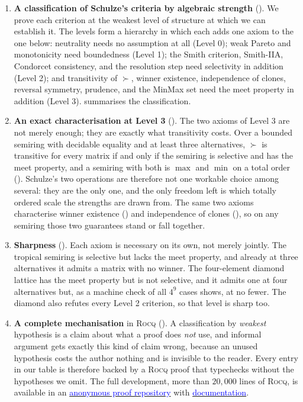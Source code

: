 \documentclass[a4paper,UKenglish,cleveref,autoref,thm-restate,anonymous]{lipics-v2021}
\newcommand{\rocq}{\textsc{Rocq}}
\begin{document}
\begin{enumerate}
\item \textbf{A classification of Schulze's criteria by algebraic strength}
(). We prove each criterion at the weakest level
of structure at which we can establish it. The levels form a hierarchy in
which each adds one axiom to the one below: neutrality needs no assumption
at all (Level 0); weak Pareto and monotonicity need boundedness (Level 1);
the Smith criterion, Smith-IIA, Condorcet consistency, and the resolution
step need selectivity in addition (Level 2); and transitivity of $\succ$,
winner existence, independence of clones, reversal symmetry, prudence, and
the MinMax set need the meet property in addition (Level 3).
 summarises the classification.

\item \textbf{An exact characterisation at Level 3}
(). The two axioms of Level 3 are not merely
enough; they are exactly what transitivity costs. Over a bounded semiring
with decidable equality and at least three alternatives, $\succ$ is
transitive for every matrix if and only if the semiring is selective and
has the meet property, and a semiring with both is $\max$ and $\min$ on a
total order (). Schulze's two operations are therefore
not one workable choice among several: they are the only one, and the only
freedom left is which totally ordered scale the strengths are drawn from.
The same two axioms characterise winner existence
() and independence of clones (),
so on any semiring those two guarantees stand or fall together.

\item \textbf{Sharpness} (). Each axiom is necessary on
its own, not merely jointly. The tropical semiring is selective but lacks
the meet property, and already at three alternatives it admits a matrix
with no winner. The four-element diamond lattice has the meet property but
is not selective, and it admits one at four alternatives but, as a machine
check of all $4^{9}$ cases shows, at no fewer. The diamond also refutes
every Level 2 criterion, so that level is sharp too.

\item \textbf{A complete mechanisation} in \rocq{}
(). A classification by \emph{weakest} hypothesis
is a claim about what a proof does \emph{not} use, and informal argument
gets exactly this kind of claim wrong, because an unused hypothesis costs
the author nothing and is invisible to the reader. Every entry in our table
is therefore backed by a \rocq{} proof that typechecks without the
hypotheses we omit. The full development, more than $20{,}000$ lines of
\rocq{}, is available in an
\href{https://anonymous.4open.science/r/Semiring_graph_algorithm-000E/README.md}{\textcolor{blue}{anonymous proof repository}} with
\href{https://anonymous.4open.science/r/Semiring_graph_algorithm-000E/docs/toc.html}{\textcolor{blue}{documentation}}.
\end{enumerate}
\end{document}
